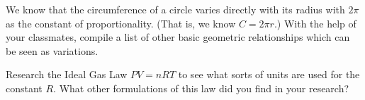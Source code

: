 \documentclass{ximera}
\begin{document}
\begin{problem}
We know that the circumference of a circle varies directly with its radius with $2\pi$ as the constant of proportionality. (That is, we know $C = 2\pi r.$)  With the help of your classmates, compile a list of other basic geometric relationships which can be seen as variations.
\end{problem}


\begin{problem}
\label{idealgasexercise} Research the Ideal Gas Law $PV = nRT$ to see what sorts of units are used for the constant $R$.  What other formulations of this law did you find in your research?
\end{problem}
\end{document}
